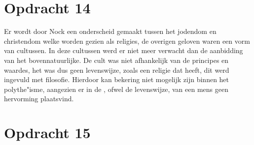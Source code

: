 \documentclass[10pt]{amsart}
\begin{document}
\section*{Opdracht 14}
Er wordt door Nock\autocite{nockConversionOldNew1933} een onderscheid gemaakt tussen het jodendom en christendom welke worden gezien als religies, de overigen geloven waren een vorm van cultussen. In deze cultussen werd er niet meer verwacht dan de aanbidding van het bovennatuurlijke. De cult was niet afhankelijk van de principes en waardes, het was dus geen levenswijze, zoals een religie dat heeft, dit werd ingevuld met filosofie. Hierdoor kan bekering niet mogelijk zijn binnen het polythe"isme, aangezien er in de , ofwel de levenswijze, van een mens geen hervorming plaatsvind.


\section*{Opdracht 15}






\newpage \printbibliography{}
\end{document}
